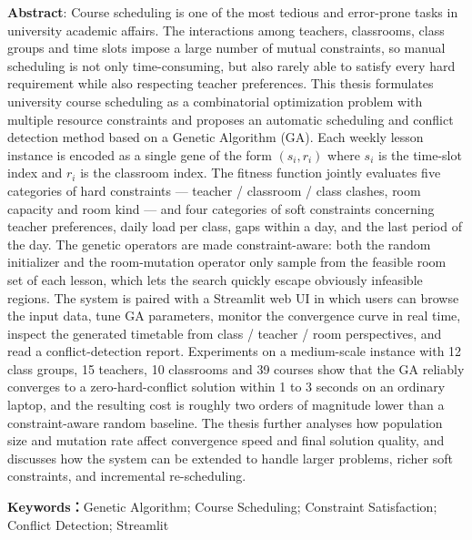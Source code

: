\noindent\textbf{Abstract}:
Course scheduling is one of the most tedious and error-prone tasks in university academic affairs. The interactions among teachers, classrooms, class groups and time slots impose a large number of mutual constraints, so manual scheduling is not only time-consuming, but also rarely able to satisfy every hard requirement while also respecting teacher preferences. This thesis formulates university course scheduling as a combinatorial optimization problem with multiple resource constraints and proposes an automatic scheduling and conflict detection method based on a Genetic Algorithm (GA). Each weekly lesson instance is encoded as a single gene of the form $(s_i, r_i)$ where $s_i$ is the time-slot index and $r_i$ is the classroom index. The fitness function jointly evaluates five categories of hard constraints --- teacher / classroom / class clashes, room capacity and room kind --- and four categories of soft constraints concerning teacher preferences, daily load per class, gaps within a day, and the last period of the day. The genetic operators are made constraint-aware: both the random initializer and the room-mutation operator only sample from the feasible room set of each lesson, which lets the search quickly escape obviously infeasible regions. The system is paired with a Streamlit web UI in which users can browse the input data, tune GA parameters, monitor the convergence curve in real time, inspect the generated timetable from class / teacher / room perspectives, and read a conflict-detection report. Experiments on a medium-scale instance with 12 class groups, 15 teachers, 10 classrooms and 39 courses show that the GA reliably converges to a zero-hard-conflict solution within 1 to 3 seconds on an ordinary laptop, and the resulting cost is roughly two orders of magnitude lower than a constraint-aware random baseline. The thesis further analyses how population size and mutation rate affect convergence speed and final solution quality, and discusses how the system can be extended to handle larger problems, richer soft constraints, and incremental re-scheduling.

\noindent\textbf{Keywords：}Genetic Algorithm; Course Scheduling; Constraint Satisfaction; Conflict Detection; Streamlit
